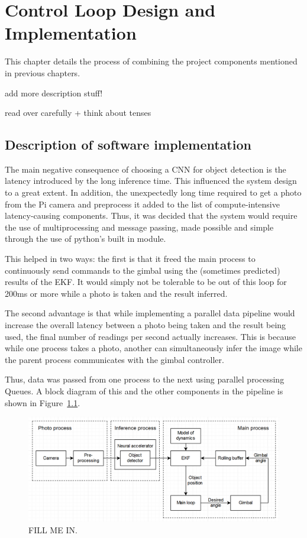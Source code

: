 \chapter{Control Loop Design and Implementation}
This chapter details the process of combining the project components mentioned in previous chapters.

{\color{red} add more description stuff!}

{\color{red} read over carefully + think about tenses}

\section{Description of software implementation}
The main negative consequence of choosing a CNN for object detection is the latency introduced by the long inference time. This influenced the system design to a great extent. In addition, the unexpectedly long time required to get a photo from the Pi camera and preprocess it added to the list of compute-intensive latency-causing components. Thus, it was decided that the system would require the use of multiprocessing and message passing, made possible and simple through the use of python's built in  module.

This helped in two ways: the first is that it freed the main process to continuously send commands to the gimbal using the (sometimes predicted) results of the EKF. It would simply not be tolerable to be out of this loop for 200ms or more while a photo is taken and the result inferred.

The second advantage is that while implementing a parallel data pipeline would increase the overall latency between a photo being taken and the result being used, the final number of readings per second actually increases. This is because while one process takes a photo, another can simultaneously infer the image while the parent process communicates with the gimbal controller.

Thus, data was passed from one process to the next using parallel processing Queues. A block diagram of this and the other components in the pipeline is shown in Figure~\ref{fig:system_block_diagram}.

\begin{figure}[h!]
  \centering
  \includegraphics[width=\textwidth]{methodology/system_block_diagram2}
  \caption{\label{fig:system_block_diagram} FILL ME IN.}
\end{figure}

